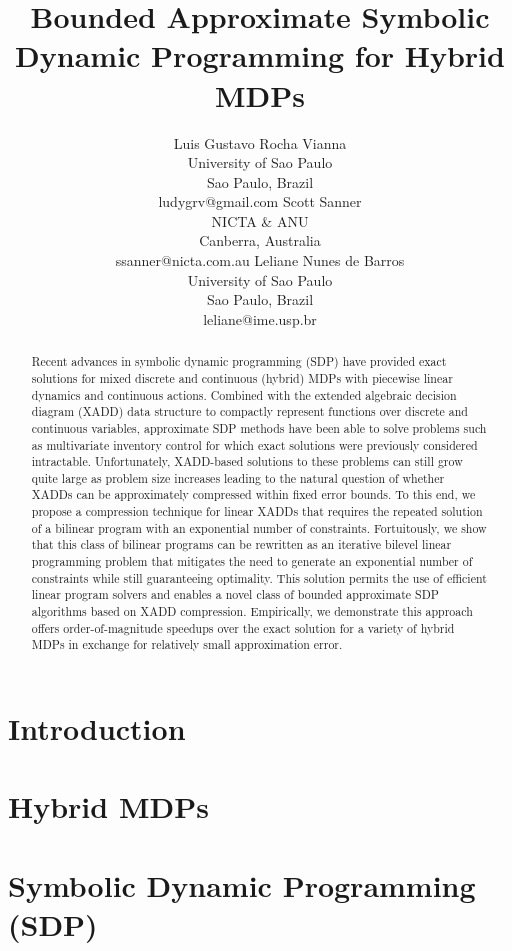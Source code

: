 \documentclass{article}
\title{	Bounded Approximate Symbolic Dynamic Programming for Hybrid MDPs }
\author{Luis Gustavo Rocha Vianna\\
University of Sao Paulo\\
Sao Paulo, Brazil\\
ludygrv@gmail.com
\And
Scott Sanner\\
NICTA \& ANU\\
Canberra, Australia\\
ssanner@nicta.com.au
\And
Leliane Nunes de Barros\\
University of Sao Paulo\\
Sao Paulo, Brazil\\
leliane@ime.usp.br}
\begin{document}
\maketitle

\begin{abstract}
Recent advances in symbolic dynamic programming (SDP) have provided
exact solutions for mixed discrete and continuous (hybrid) MDPs with
piecewise linear dynamics and continuous actions. Combined with the
extended algebraic decision diagram (XADD) data structure to compactly
represent functions over discrete and continuous variables,
approximate SDP methods have been able to solve problems such as
multivariate inventory control for which exact solutions were
previously considered intractable. Unfortunately, XADD-based solutions
to these problems can still grow quite large as problem size increases
leading to the natural question of whether XADDs can be approximately
compressed within fixed error bounds. To this end, we propose a
compression technique for linear XADDs that requires the repeated
solution of a bilinear program with an exponential number of
constraints. Fortuitously, we show that this class of bilinear
programs can be rewritten as an iterative bilevel linear programming
problem that mitigates the need to generate an exponential number of
constraints while still guaranteeing optimality. This solution permits
the use of efficient linear program solvers and enables a novel class
of bounded approximate SDP algorithms based on XADD
compression. Empirically, we demonstrate this approach offers
order-of-magnitude speedups over the exact solution for a variety of
hybrid MDPs in exchange for relatively small approximation error.
\end{abstract}

\section{Introduction}



\section{Hybrid MDPs}



\section{Symbolic Dynamic Programming (SDP)}
\end{document}
